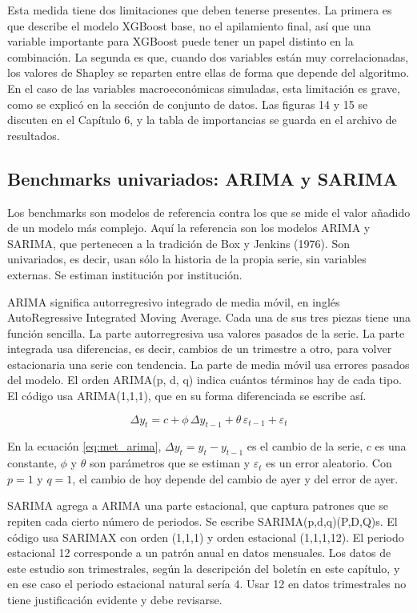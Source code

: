 Esta medida tiene dos limitaciones que deben tenerse presentes. La primera es que describe el modelo XGBoost base, no el apilamiento final, así que una variable importante para XGBoost puede tener un papel distinto en la combinación. La segunda es que, cuando dos variables están muy correlacionadas, los valores de Shapley se reparten entre ellas de forma que depende del algoritmo. En el caso de las variables macroeconómicas simuladas, esta limitación es grave, como se explicó en la sección de conjunto de datos. Las figuras 14 y 15 se discuten en el Capítulo 6, y la tabla de importancias se guarda en el archivo de resultados.

\subsection{Benchmarks univariados: ARIMA y SARIMA}
Los benchmarks son modelos de referencia contra los que se mide el valor añadido de un modelo más complejo. Aquí la referencia son los modelos ARIMA y SARIMA, que pertenecen a la tradición de Box y Jenkins (1976). Son univariados, es decir, usan sólo la historia de la propia serie, sin variables externas. Se estiman institución por institución.

ARIMA significa autorregresivo integrado de media móvil, en inglés AutoRegressive Integrated Moving Average. Cada una de sus tres piezas tiene una función sencilla. La parte autorregresiva usa valores pasados de la serie. La parte integrada usa diferencias, es decir, cambios de un trimestre a otro, para volver estacionaria una serie con tendencia. La parte de media móvil usa errores pasados del modelo. El orden ARIMA(p, d, q) indica cuántos términos hay de cada tipo. El código usa ARIMA(1,1,1), que en su forma diferenciada se escribe así.

\begin{equation}
\label{eq:met_arima}
\Delta y_t = c + \phi\,\Delta y_{t-1} + \theta\,\varepsilon_{t-1} + \varepsilon_t
\end{equation}

En la ecuación \eqref{eq:met_arima}, $\Delta y_t = y_t - y_{t-1}$ es el cambio de la serie, $c$ es una constante, $\phi$ y $\theta$ son parámetros que se estiman y $\varepsilon_t$ es un error aleatorio. Con $p=1$ y $q=1$, el cambio de hoy depende del cambio de ayer y del error de ayer.

SARIMA agrega a ARIMA una parte estacional, que captura patrones que se repiten cada cierto número de periodos. Se escribe SARIMA(p,d,q)(P,D,Q)s. El código usa SARIMAX con orden (1,1,1) y orden estacional (1,1,1,12). El periodo estacional 12 corresponde a un patrón anual en datos mensuales. Los datos de este estudio son trimestrales, según la descripción del boletín en este capítulo, y en ese caso el periodo estacional natural sería 4. Usar 12 en datos trimestrales no tiene justificación evidente y debe revisarse. %

